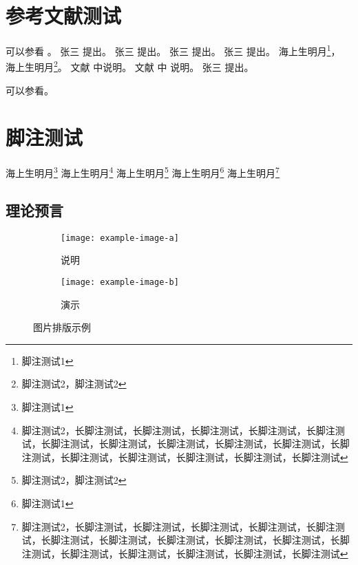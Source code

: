 \section{参考文献测试}

可以参看 \parencite{Weng:2017jyh,Biro:2017flp,Hod:2017ssh}。
张三 \cite{叶普1993关于对瞬心的动量矩定理}提出。
张三 \parencite{爱因斯坦文集2009}提出。
张三 \cite{叶普1993关于对瞬心的动量矩定理}提出。
张三 \cite{叶普1993关于对瞬心的动量矩定理,2003张量分析,lanczos1986variational}提出。
海上生明月\footnote{脚注测试1}，
海上生明月\footnote{脚注测试2，脚注测试2}。
文献 \cite{2003张量分析}中说明。
文献 \cite{叶普1993关于对瞬心的动量矩定理,2003张量分析,lanczos1986variational}中 说明。
张三 \parencite{爱因斯坦文集2009,叶普1993关于对瞬心的动量矩定理,2003张量分析,lanczos1986variational}提出。

可以参看\cite{Litvinova:2017jnd,Li:2017kdj}。



\section{脚注测试}%

\zhlipsum[2-3]
海上生明月\footnote{脚注测试1}
海上生明月\footnote{脚注测试2，长脚注测试，长脚注测试，长脚注测试，长脚注测试，长脚注测试，长脚注测试，长脚注测试，长脚注测试，长脚注测试，长脚注测试，长脚注测试，长脚注测试，长脚注测试，长脚注测试，长脚注测试，长脚注测试}
海上生明月\footnote{脚注测试2，脚注测试2}
海上生明月\footnote{脚注测试1}
海上生明月\footnote{脚注测试2，长脚注测试，长脚注测试，长脚注测试，长脚注测试，长脚注测试，长脚注测试，长脚注测试，长脚注测试，长脚注测试，长脚注测试，长脚注测试，长脚注测试，长脚注测试，长脚注测试，长脚注测试，长脚注测试}




\subsection{理论预言}%



\zhlipsum[3]


\begin{figure}[h!]
	\centering
	\begin{subfigure}{0.4\linewidth}
		\centering
		\texttt{[image: example-image-a]}
		\caption{说明}\label{}
	\end{subfigure}
	\hfil
	\begin{subfigure}{0.4\linewidth}
		\centering
		\texttt{[image: example-image-b]}
		\caption{演示}\label{}
	\end{subfigure}
	\caption{图片排版示例}
\end{figure}

